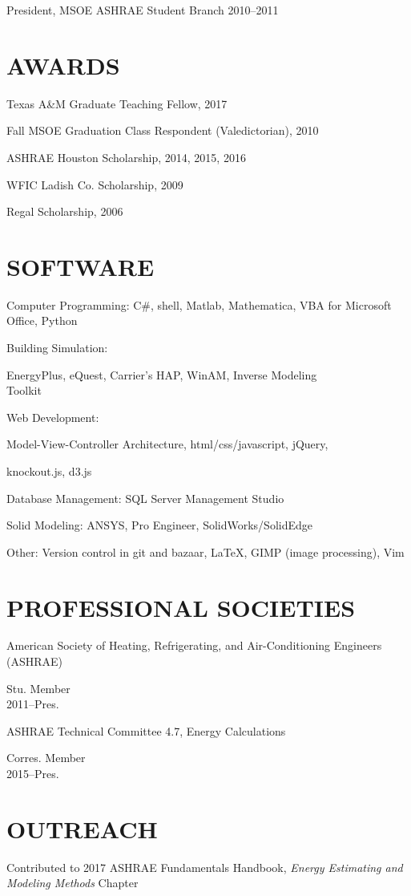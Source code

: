 \documentclass[margin]{res} %
\begin{document}
\begin{resume}
President, MSOE ASHRAE Student Branch \hfill 2010--2011

\section{AWARDS}
Texas A\&M Graduate Teaching Fellow, 2017

Fall MSOE Graduation Class Respondent (Valedictorian), 2010

ASHRAE Houston Scholarship, 2014, 2015, 2016

WFIC Ladish Co. Scholarship, 2009

Regal Scholarship, 2006

\section{SOFTWARE}

Computer Programming: C\#, shell, Matlab, Mathematica, VBA for Microsoft Office, Python

Building Simulation: \parbox[t]{16cm}{ EnergyPlus, eQuest, Carrier's
HAP, WinAM, Inverse Modeling \\ Toolkit }

Web Development: \parbox[t]{20cm}{Model-View-Controller Architecture,
html/css/javascript, jQuery,\par knockout.js, d3.js}

Database Management: SQL Server Management Studio

Solid Modeling: ANSYS, Pro Engineer, SolidWorks/SolidEdge

Other: Version control in git and bazaar, \LaTeX, GIMP (image processing), Vim

\section{PROFESSIONAL SOCIETIES}

\parbox[t]{9cm}{American Society of Heating, Refrigerating, and Air-Conditioning Engineers (ASHRAE)} \hfill \parbox[t]{3cm}{\raggedleft Stu. Member \\ 2011--Pres.}

\parbox[t]{9cm}{ASHRAE Technical Committee 4.7, Energy Calculations }\hfill \parbox[t]{3cm}{\raggedleft Corres. Member \\ 2015--Pres.}

\section{OUTREACH}
\parbox[t]{10cm}{Contributed to 2017 ASHRAE Fundamentals Handbook, \textit{Energy Estimating and Modeling Methods} Chapter}


\end{resume}
\end{document}
